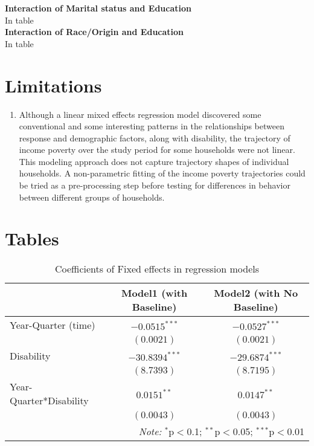 \documentclass[11pt]{extarticle} %
\begin{document}
\noindent
{\bf{Interaction of Marital status and Education}} \\
In table \\

\noindent
{\bf{Interaction of Race/Origin and Education}} \\
In table \\

\section{Limitations}
\begin{enumerate}
\item Although a linear mixed effects regression model discovered some conventional and some interesting patterns in the relationships between response and demographic factors, along with disability, the trajectory of income poverty over the study period for some households were not linear. This modeling approach does not capture trajectory shapes of individual households. A non-parametric fitting of the income poverty trajectories could be tried as a pre-processing step before testing for differences in behavior between different groups of households. 
\end{enumerate}

\newpage
\section{Tables}

\noindent
\begin{table}[H] 
\centering 
\footnotesize
\begin{tabular}{l|c|c}
\hline 
\hline 
& Model1 (with Baseline) & Model2 (with No Baseline) \\
\hline 
Year-Quarter (time)	&	$-0.0515^{***}$		&	$-0.0527^{***}$ 	\\
			&	$(0.0021)$		&	$(0.0021)$		\\
Disability		&	$-30.8394^{***}$	&	$-29.6874^{***}$	\\    
			&	$(8.7393)$		&	$(8.7195)$		\\
Year-Quarter*Disability	&	$0.0151^{**}$		&	$0.0147^{**}$		\\
			&	$(0.0043)$		&	$(0.0043)$		\\
\hline 
\hline 
\multicolumn{3}{r}{\textit{Note:}  $^{*}$p$<$0.1; $^{**}$p$<$0.05; $^{***}$p$<$0.01} \\ 

\end{tabular}
\caption{Coefficients of Fixed effects in regression models} 
\label{tab:FixedEffectsBetas} 
\end{table}
\end{document}
